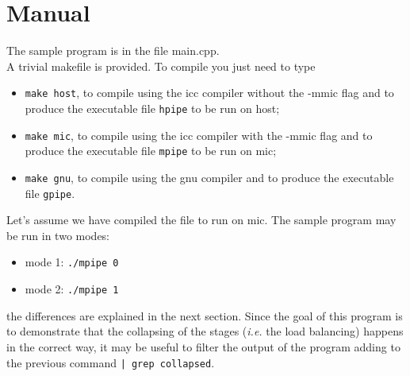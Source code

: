 \documentclass[12pt]{article}
\begin{document}
\section{Manual}
The sample program is in the file main.cpp. \\
A trivial makefile is provided. To compile you just need to type
\begin{itemize}
\item \texttt{make host}, to compile using the icc compiler without the -mmic flag and to produce the executable file \texttt{hpipe} to be run on host;
\item \texttt{make mic}, to compile using the icc compiler with the -mmic flag and to produce the executable file \texttt{mpipe} to be run on mic;
\item \texttt{make gnu}, to compile using the gnu compiler and to produce the executable file \texttt{gpipe}.
\end{itemize}   
Let's assume we have compiled the file to run on mic. The sample program may be run in two modes:
\begin{itemize}
\item mode 1: \texttt{./mpipe 0}
\item mode 2: \texttt{./mpipe 1}
\end{itemize} 
the differences are explained in the next section. Since the goal of this program is to demonstrate that the collapsing of the stages (\textit{i.e.} the load balancing) happens in the correct way, it may be useful to filter the output of the program adding to the previous command \texttt{| grep collapsed}.
\end{document}
